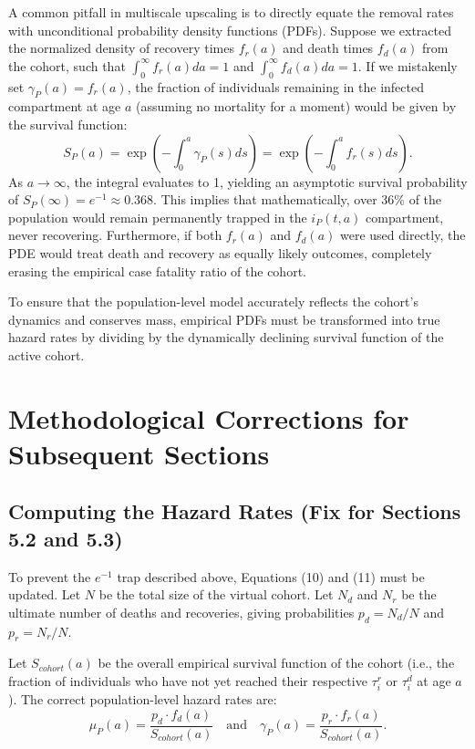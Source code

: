 \documentclass[11pt]{article}
\begin{document}
A common pitfall in multiscale upscaling is to directly equate the removal rates with unconditional probability density functions (PDFs). Suppose we extracted the normalized density of recovery times $f_r(a)$ and death times $f_d(a)$ from the cohort, such that $\int_0^\infty f_r(a)da = 1$ and $\int_0^\infty f_d(a)da = 1$. If we mistakenly set $\gamma_P(a) = f_r(a)$, the fraction of individuals remaining in the infected compartment at age $a$ (assuming no mortality for a moment) would be given by the survival function:
\begin{equation}
    S_P(a) = \exp\left( - \int_0^a \gamma_P(s) ds \right) = \exp\left( - \int_0^a f_r(s) ds \right).
\end{equation}
As $a \to \infty$, the integral evaluates to 1, yielding an asymptotic survival probability of $S_P(\infty) = e^{-1} \approx 0.368$. This implies that mathematically, over 36\% of the population would remain permanently trapped in the $i_P(t,a)$ compartment, never recovering. Furthermore, if both $f_r(a)$ and $f_d(a)$ were used directly, the PDE would treat death and recovery as equally likely outcomes, completely erasing the empirical case fatality ratio of the cohort. 

To ensure that the population-level model accurately reflects the cohort's dynamics and conserves mass, empirical PDFs must be transformed into true hazard rates by dividing by the dynamically declining survival function of the active cohort.

\section{Methodological Corrections for Subsequent Sections}

\subsection{Computing the Hazard Rates (Fix for Sections 5.2 and 5.3)}

To prevent the $e^{-1}$ trap described above, Equations (10) and (11) must be updated. Let $N$ be the total size of the virtual cohort. Let $N_d$ and $N_r$ be the ultimate number of deaths and recoveries, giving probabilities $p_d = N_d/N$ and $p_r = N_r/N$. 

Let $S_{cohort}(a)$ be the overall empirical survival function of the cohort (i.e., the fraction of individuals who have not yet reached their respective $\tau_i^r$ or $\tau_i^d$ at age $a$). The correct population-level hazard rates are:
\begin{equation}
    \mu_P(a) = \frac{p_d \cdot f_d(a)}{S_{cohort}(a)} \quad \text{and} \quad \gamma_P(a) = \frac{p_r \cdot f_r(a)}{S_{cohort}(a)}.
\end{equation}
\end{document}
